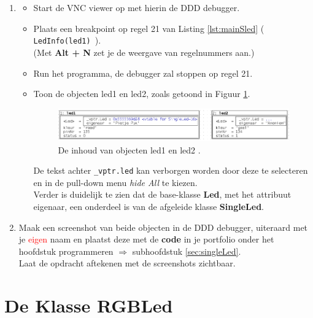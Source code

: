 \begin{enumerate}[label=(\alph*)]
\newpage
\item 
\begin{itemize}
	\item Start de VNC viewer op met hierin de DDD debugger.
	\item Plaats een breakpoint op regel 21 van Listing \ref{lst:mainSled} ({\small \texttt{ LedInfo(led1) }}). \\ (Met \textbf{Alt + N} zet je de weergave van regelnummers aan.)
	\item Run het programma, de debugger zal stoppen op regel 21.
	\item Toon de objecten led1 en led2, zoals getoond in Figuur \ref{fig:DDDLed1_2}. 
	\begin{figure}[h!]
		\captionsetup{justification=centering}
    	\includegraphics[width=0.95 \textwidth]{figuren/DDDLed1Led2}
		\centering
		\caption{De inhoud van objecten led1 en led2 .}
		\label{fig:DDDLed1_2}
	\end{figure}
	De tekst achter \texttt{\_vptr.led} kan verborgen worden door deze te selecteren en in de pull-down menu \textit{hide All} te kiezen. \\
	Verder is duidelijk te zien dat de base-klasse  \textbf{Led}, met het attribuut eigenaar, een onderdeel is van de afgeleide klasse \textbf{SingleLed}.
\end{itemize}

\item Maak een screenshot van beide objecten in de DDD debugger, uiteraard met je \textcolor{red}{\huge{eigen}} naam en plaatst deze met de \textbf{code} in je portfolio onder het hoofdstuk programmeren $\Longrightarrow$ subhoofdstuk \ref{sec:singleLed}. \\ 
Laat de opdracht aftekenen met de screenshots zichtbaar.

\end{enumerate}
\newpage
\section{De Klasse RGBLed} \label{sec:rgb}

